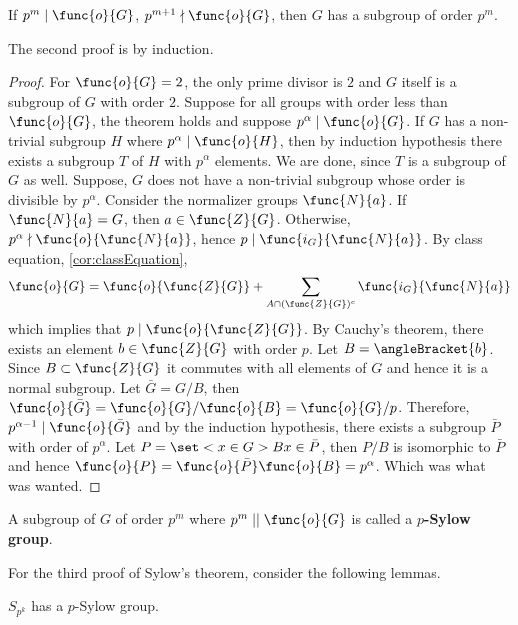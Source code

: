 \begin{corollary}
    If \(p^m \mid \func{o}{G}\), \(p^{m+1} \nmid \func{o}{G}\), then \(G\) has a subgroup of order \(p^m\).
\end{corollary}

The second proof is by induction. 
\begin{proof}
    For \(\func{o}{G} = 2\), the only prime divisor is \(2\) and \(G\) itself is a subgroup of \(G\) with order \(2\). Suppose for all groups with order less than \(\func{o}{G}\), the theorem holds and suppose \(p^{\alpha} \mid \func{o}{G}\). If \(G\) has a non-trivial subgroup \(H\) where \(p^{\alpha} \mid \func{o}{H}\), then by induction hypothesis there exists a subgroup \(T\) of \(H\) with \(p^{\alpha}\) elements. We are done, since \(T\) is a subgroup of \(G\) as well. Suppose, \(G\) does not have a non-trivial subgroup whose order is divisible by \(p^{\alpha}\). Consider the normalizer groups \(\func{N}{a}\). If \(\func{N}{a} = G\), then \(a \in \func{Z}{G}\). Otherwise, \(p^{\alpha}  \nmid \func{o}{\func{N}{a}}\), hence \(p \mid \func{i_G}{\func{N}{a}}\). By class equation, \ref{cor:classEquation},
    \begin{equation*}
        \func{o}{G} = \func{o}{\func{Z}{G}} + \sum_{A \cap (\func{Z}{G})^c}  \func{i_G}{\func{N}{a}}
    \end{equation*}
    which implies that \(p \mid \func{o}{\func{Z}{G}}\). By Cauchy's theorem, there exists an element \(b \in \func{Z}{G}\) with order \(p\). Let \(B = \angleBracket{b}\). Since \(B \subset \func{Z}{G}\) it commutes with all elements of \(G\) and hence it is a normal subgroup. Let \(\bar{G} = G/B\), then \(\func{o}{\bar{G}} = \func{o}{G}/\func{o}{B} = \func{o}{G}/p\). Therefore, \(p^{\alpha - 1} \mid \func{o}{\bar{G}}\) and by the induction hypothesis, there exists a subgroup \(\bar{P}\) with order of \(p^{\alpha}\). Let \(P = \set<x \in G>{Bx \in \bar{P}}\), then \(P/B\) is isomorphic to \(\bar{P}\) and hence \(\func{o}{P} = \func{o}{\bar{P}} \func{o}{B} = p^{\alpha}\). Which was what was wanted.
\end{proof}

A subgroup of \(G\) of order \(p^m\) where \(p^m \mid\mid \func{o}{G}\) is called a \textbf{\(p\)-Sylow group}.

For the third proof of Sylow's theorem, consider the following lemmas.

\begin{lemma}
    \(S_{p^k}\) has a \(p\)-Sylow group.
\end{lemma}

